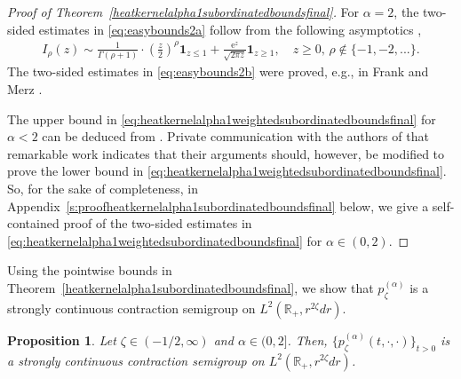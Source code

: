 \documentclass[12pt,reqno,a4paper]{amsart}
\newtheorem{proposition}[theorem]{Proposition}
\theoremstyle{definition}
\theoremstyle{remark}
\numberwithin{equation}{section}
\newcommand{\1}{\mathbbm{1}}
\newcommand{\R}{\mathbb{R}}
\newcommand{\me}[1]{\mathrm{e}^{#1}}
\newcommand{\one}{\mathbf{1}}
\begin{document}
\begin{proof}[Proof of Theorem~\ref{heatkernelalpha1subordinatedboundsfinal}]
  For $\alpha=2$, the two-sided estimates in \eqref{eq:easybounds2a} follow from the following asymptotics \cite[(10.30.1), (10.30.4)]{NIST:DLMF},
  \begin{align}
    I_\rho(z)
    \sim \frac{1}{\Gamma(\rho+1)}\cdot \left(\frac{z}{2}\right)^\rho \one_{z\leq1} + \frac{\me{z}}{\sqrt{2\pi z}}\one_{z\geq1}, \quad z\geq0,\,\rho\notin\{-1,-2,...\}.
  \end{align}
  The two-sided estimates in \eqref{eq:easybounds2b} were proved, e.g., in Frank and Merz \cite[Theorem~10]{FrankMerz2023}.
  
The upper bound in \eqref{eq:heatkernelalpha1weightedsubordinatedboundsfinal} for $\alpha<2$ can be deduced from %
\cite[Corollary~3.8]{GrzywnyTrojan2021}. Private communication with the authors of that remarkable work indicates that their arguments should, however, be modified to prove the lower bound in \eqref{eq:heatkernelalpha1weightedsubordinatedboundsfinal}. So, for the sake of completeness, in Appendix~\ref{s:proofheatkernelalpha1subordinatedboundsfinal} below, we give a self-contained proof of the two-sided estimates in \eqref{eq:heatkernelalpha1weightedsubordinatedboundsfinal} for $\alpha\in (0,2)$.
\end{proof}


Using the pointwise bounds in Theorem~\ref{heatkernelalpha1subordinatedboundsfinal}, we show that $p_\zeta^{(\alpha)}$ is a strongly continuous contraction semigroup on $L^2(\R_+,r^{2\zeta}dr)$.

\begin{proposition}
  \label{strongcontinuity}
  Let $\zeta\in(-1/2,\infty)$ and $\alpha\in(0,2]$.
  Then, $\{p_\zeta^{(\alpha)}(t,\cdot,\cdot)\}_{t>0}$ is a strongly continuous contraction semigroup on $L^2(\R_+,r^{2\zeta}dr)$.
\end{proposition}
\end{document}
